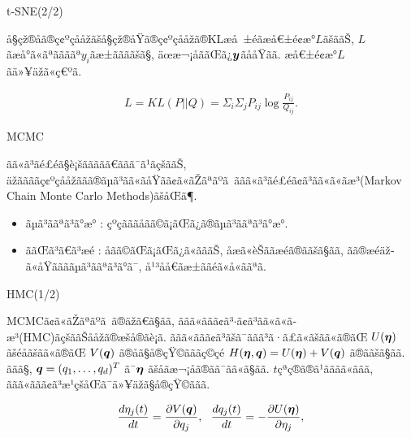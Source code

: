 \documentclass[dvipdfmx]{beamer} %
\newcommand{\bm}[1]{\mbox{\boldmath $#1$}}
\begin{document}
\begin{frame}{t-SNE(2/2)}

å§çž®åã®ç¢ºçååžãšå§çž®åŸã®ç¢ºçååžã®KLæå ±éãæå€±é¢æ°$L$ãšããŠ, $L$ãæå°ã«ãªããããª$y_i$ãæ±ããããšã§, äœæ¬¡åããŒã¿$\bm y$ãååŸãã. æå€±é¢æ°$L$ãä»¥äžã«ç€ºã.

\begin{eqnarray*}
\label{tsne3}
L = KL(P || Q) = \Sigma_i \Sigma_j P_{ij} \log \frac{P_{ij}}{Q_{ij}}.
\end{eqnarray*}
\end{frame}

\begin{frame}{MCMC}

ãã«ã³ãé£éã§è¡šããããã€ããã¯ã¹ãçšããŠ, äžããããç¢ºçååžããã®ãµã³ãã«ãåŸãã¢ã«ãŽãªãºã ããã«ã³ãé£éã¢ã³ãã«ã«ã­æ³(Markov Chain Monte Carlo Methods)ãšåŒã¶.

\begin{itemize}
	\item 
	ãµã³ããªã³ã°æ° : çºçãããåãã©ã¡ãŒã¿ã®ãµã³ããªã³ã°æ°.
	\vspace{0.2cm}
	\item
	ããŒã³ã€ã³æé : åãã©ãŒã¡ãŒã¿ã«ãããŠ, åæã«èŠããæéã®ããšã§ãã, ãã®æéäž­ã«åŸããããµã³ããªã³ã°ã¯, å¹³åå€ãæ±ããéã«å«ããªã.
\end{itemize}
	
\end{frame}


\begin{frame}{HMC(1/2)}

MCMCã¢ã«ãŽãªãºã ã®äžã€ã§ãã, ããã«ããã¢ã³$\cdot$ã¢ã³ãã«ã«ã­æ³(HMC)ãçšããŠååžã®æšå®ãè¡ã. ããã«ããã¢ã³ãšã¯ããã³ã·ã£ã«ãšãã«ã®ãŒ $U(\bm \eta)$ ãšéåãšãã«ã®ãŒ $V(\bm q)$ ã®åã§å®çŸ©ãããç©çé $H(\bm \eta, \bm q) = U(\bm \eta) + V(\bm q)$ ã®ããšã§ãã. ããã§, $\bm q = (q_1, \dots, q_d)^T$ ã¯$\bm \eta$ ãšåãæ¬¡åã®ãã¯ãã«ã§ãã. $t$çªç®ã®ã¹ãããã«ããã, ããã«ããã¢ã³æ¹çšåŒã¯ä»¥äžã§å®çŸ©ããã. 

\begin{eqnarray*}
\label{HMC}
\frac{d \eta_j(t)}{dt} = \frac{\partial V(\bm q)}{\partial q_j},\ \ \frac{d q_j(t)}{dt} = - \frac{\partial U(\bm \eta)}{\partial \eta_j},
\end{eqnarray*}
\end{frame}
\end{document}
